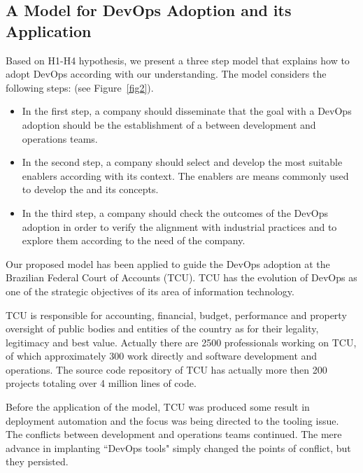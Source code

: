 \subsection{A Model for DevOps Adoption and its Application}\label{sec:case_study}

Based on H1-H4 hypothesis, we present a three step model that
explains how to adopt DevOps according with our understanding. The 
model considers the following steps: 
(see Figure~\ref{fig2}).

\begin{itemize}
\item In the first step, a company should
disseminate that the goal with a DevOps adoption should be
the establishment of a  between
development and operations teams.

\item In the second step, a company should select and develop
the most suitable enablers according with its context. The enablers
are means commonly used to develop the 
and its concepts.

\item In the third step, a company should check the outcomes of the
DevOps adoption in order to verify the alignment with
industrial practices and to explore them according to the
need of the company.
\end{itemize}



Our proposed model has been applied to guide the DevOps adoption at the Brazilian Federal Court of
Accounts (TCU). TCU has the
evolution of DevOps as one of the strategic objectives of its area of
information technology.

TCU is responsible for accounting, financial, budget, performance and property
oversight of public bodies and entities of the country as for their legality,
legitimacy and best value. Actually there are 2500 professionals working on TCU,
of which approximately 300 work directly and software development and operations.
The source code repository of TCU has actually more then 200 projects totaling
over 4 million lines of code.

Before the application of the model, TCU was produced some result in deployment
automation and the focus was being directed to the tooling issue. The conflicts
between development and operations teams continued. The mere advance in
implanting ``DevOps tools" simply changed the points of conflict, but they
persisted.

